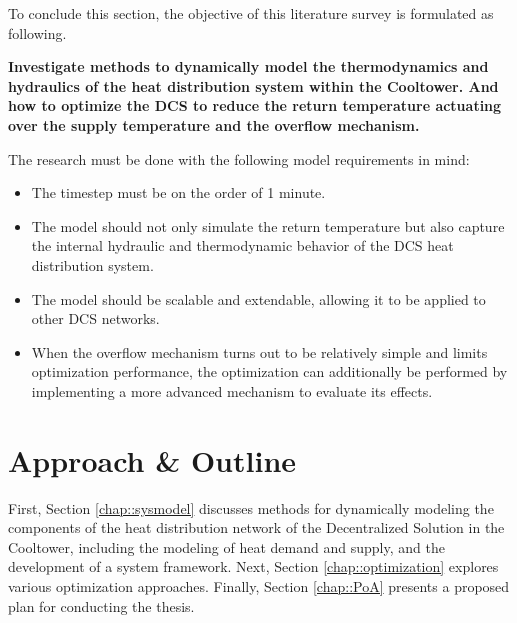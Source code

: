 To conclude this section, the objective of this literature survey is formulated as following.

{\centering
\textbf{Investigate methods to dynamically model the thermodynamics and hydraulics of the heat distribution system within the Cooltower. And how to optimize the DCS to reduce the return temperature actuating over the supply temperature and the overflow mechanism.}\par
}
The research must be done with the following model requirements in mind:

\begin{itemize}
    \item The timestep must be on the order of 1 minute. 
    \item The model should not only simulate the return temperature but also capture the internal hydraulic and thermodynamic behavior of the DCS heat distribution system.
    \item The model should be scalable and extendable, allowing it to be applied to other DCS networks.
    \item When the overflow mechanism turns out to be relatively simple and limits optimization performance, the optimization can additionally be performed by implementing a more advanced mechanism to evaluate its effects.
\end{itemize}

\section{Approach \& Outline}
First, Section \ref{chap::sysmodel} discusses methods for dynamically modeling the components of the heat distribution network of the Decentralized Solution in the Cooltower, including the modeling of heat demand and supply, and the development of a system framework. Next, Section \ref{chap::optimization} explores various optimization approaches. Finally, Section \ref{chap::PoA} presents a proposed plan for conducting the thesis.



